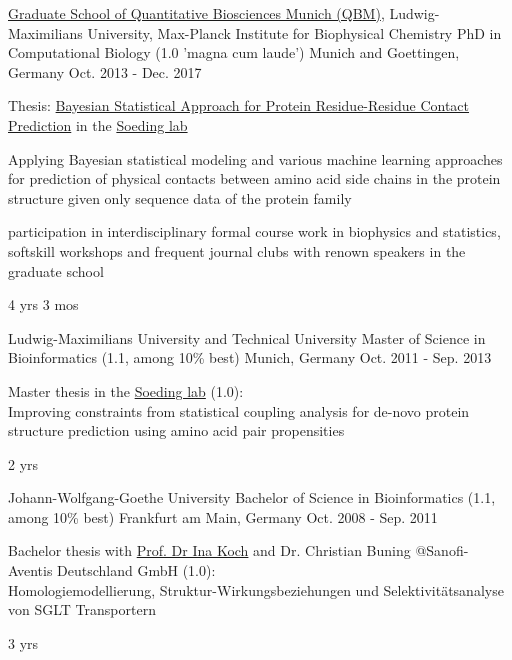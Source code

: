 

\begin{cventries}

  \cventrynew
  	{\href{http://www.qbm.genzentrum.lmu.de/}{Graduate School of Quantitative Biosciences Munich (QBM)}, Ludwig-Maximilians University, Max-Planck Institute for Biophysical Chemistry}
  	{PhD in Computational Biology (1.0 'magna cum laude')} 
	{Munich and Goettingen, Germany}
	{Oct. 2013 - Dec. 2017}
	{
		\begin{cvitems}
			\item {Thesis: \href{https://edoc.ub.uni-muenchen.de/21635/}{Bayesian Statistical Approach for Protein Residue-Residue Contact Prediction} in the \href{http://www.mpibpc.mpg.de/soeding}{Soeding lab}}
			\item {Applying Bayesian statistical modeling and various machine learning approaches for prediction of physical contacts between amino acid side chains in the protein structure given only sequence data of the protein family}
			\item {participation in interdisciplinary formal course work in biophysics and statistics, softskill workshops and frequent journal clubs with renown speakers in the graduate school}
		\end{cvitems}
	}
	{4 yrs 3 mos}

  \cventrynew
  	{Ludwig-Maximilians University and Technical University}
    {Master of Science in Bioinformatics (1.1, among 10\% best)} 
	{Munich, Germany}
	{Oct. 2011 - Sep. 2013}
	{
		\begin{cvitems}
			\item {Master thesis in the \href{http://www.mpibpc.mpg.de/soeding}{Soeding lab} (1.0):\\Improving constraints from statistical coupling analysis for de-novo protein structure prediction using amino acid pair propensities}
		\end{cvitems}
	}
	{2 yrs}

  \cventrynew
    {Johann-Wolfgang-Goethe University } %
    {Bachelor of Science in Bioinformatics (1.1, among 10\% best)} %
    {Frankfurt am Main, Germany} %
    {Oct. 2008 - Sep. 2011} %
    {
      \begin{cvitems} %
        \item {Bachelor thesis with \href{mailto:ina.koch@bioinformatik.uni-frankfurt.de}{Prof. Dr Ina Koch} and Dr. Christian Buning  @Sanofi-Aventis Deutschland GmbH (1.0):\\Homologiemodellierung, Struktur-Wirkungsbeziehungen und Selektivitätsanalyse von SGLT Transportern}
      \end{cvitems}
    }
    {3 yrs}



\end{cventries}
